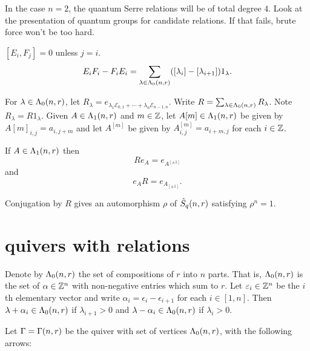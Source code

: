 \documentclass[a4paper, 11pt]{report}
\begin{document}
\begin{lemma}[quantum Serre relations: $n=2$]
{\color{gray} In the case $n=2$, the quantum Serre relations will be of total degree $4$. Look at the presentation of quantum groups for candidate relations. If that fails, brute force won't be too hard.}
\end{lemma}

\begin{lemma}
$[E_i, F_j] = 0$ unless $j=i$.
\begin{equation*}
E_i F_i - F_i E_i = \sum_{\lambda\in\Lambda_0(n,r)} ([\lambda_i] - [\lambda_{i+1}])1_\lambda.
\end{equation*}
\end{lemma}


{\color{gray}
For $\lambda\in\Lambda_0(n,r)$, let $R_\lambda = e_{\lambda_1\mathcal{E}_{0,1}+\cdots +\lambda_n\mathcal{E}_{n-1,n}}$. Write $R = \sum_{\lambda\in\Lambda_0(n,r)} R_\lambda$. Note $R_\lambda = R 1_\lambda$. Given $A\in\Lambda_1(n,r)$ and $m\in\mathbb{Z}$, let $A[m]\in\Lambda_1(n,r)$ be given by $A[m]_{i,j} = a_{i,j+m}$ and let $A^{[m]}$ be given by $A^{[m]}_{i,j} = a_{i+m,j}$ for each $i\in\mathbb{Z}$.

\begin{lemma}[Shifting]
If $A\in\Lambda_1(n,r)$ then
\begin{equation*}
R e_A = e_{A^{[\pm 1]}}
\end{equation*}
and
\begin{equation*}
e_A R = e_{A_{[\pm 1]}}.
\end{equation*}
\end{lemma}

Conjugation by $R$ gives an automorphism $\rho$ of $\hat{S}_q(n,r)$ satisfying $\rho^n = 1$.
}

\section{quivers with relations}

Denote by $\Lambda_0(n,r)$ the set of compositions of $r$ into $n$ parts. That is, $\Lambda_0(n,r)$ is the set of $\alpha\in\mathbb{Z}^n$ with non-negative entries which sum to $r$. Let $\varepsilon_i\in\mathbb{Z}^n$ be the $i$th elementary vector and write $\alpha_i = \epsilon_i  -\epsilon_{i+1}$ for each $i\in [1,n]$. Then $\lambda +\alpha_i\in\Lambda_0(n,r)$ if $\lambda_{i+1}>0$ and $\lambda -\alpha_i\in\Lambda_0(n,r)$ if $\lambda_i >0$.

Let $\Gamma=\Gamma(n,r)$ be the quiver with set of vertices $\Lambda_0(n,r)$, with the following arrows:
\end{document}

